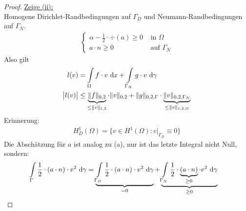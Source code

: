 \begin{proof}
\underline{Zeige (ii):}\\
Homogene Dirichlet-Randbedingungen auf $\Gamma_D$ und Neumann-Randbedingungen auf $\Gamma_N$.
\begin{align*}
	\left\{\begin{array}{rl}
			\alpha-\frac{1}{2}\cdot\div(a)\geq0 &\text{ in }\Omega\\
			a\cdot n\geq0&\text{ auf }\Gamma_N
\end{array}\right.
\end{align*}
Also gilt
\begin{align*}
l(v)&=\int\limits_\Omega f\cdot v\text{ d} x+\int\limits_{\Gamma_N}g\cdot v\text{ d}\gamma\\
\big|l(v)\big|&\leq\underbrace{\Vert f\Vert_{0,2}}_{\leq\Vert v\Vert_{1,2}}\cdot\Vert v\Vert_{0,2}+\Vert g\Vert_{0,2,\Gamma}\cdot\underbrace{\Vert v\Vert_{0,2,\Gamma_N}}_{\leq\Vert v\Vert_{1,2,\Omega}}
\end{align*}
Erinnerung:
\begin{align*}
H^1_D(\Omega)=\big\lbrace v\in H^1(\Omega):v|_{\Gamma_D}\equiv 0\big\rbrace
\end{align*}
Die Abschätzung für $a$ ist analog zu (a), nur ist das letzte Integral nicht Null, sondern:
\begin{align*}
\int\limits_\Gamma\frac{1}{2}\cdot(a\cdot n)\cdot v^2\text{ d}\gamma
&=\underbrace{\int\limits_{\Gamma_D}\frac{1}{2}\cdot(a\cdot n)\cdot v^2\text{ d}\gamma}_{=0}+\underbrace{\int\limits_{\Gamma_N}\frac{1}{2}\cdot\underbrace{(a\cdot n)}_{\geq0}\cdot v^2\text{ d}\gamma}_{\geq0}
\end{align*}


\end{proof}
